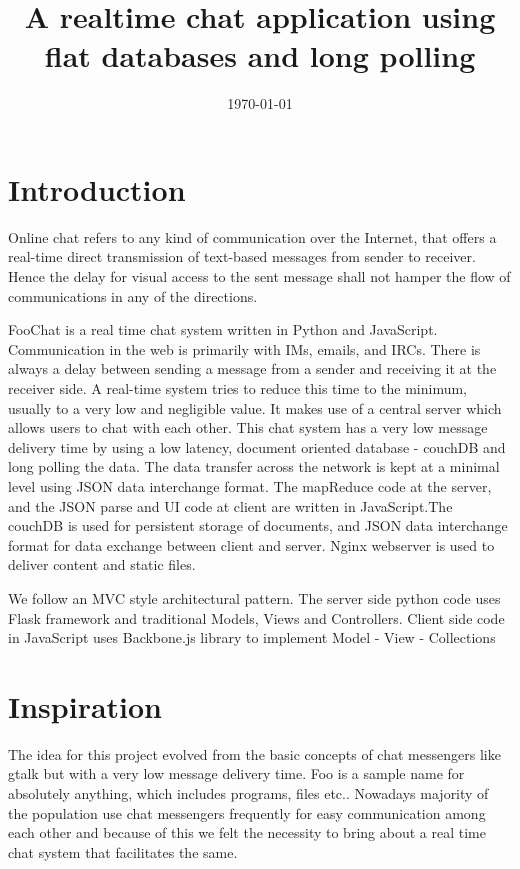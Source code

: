\documentclass[a4paper,11pt,conference]{IEEEtran}
\title{A realtime chat application using flat databases and long polling}
\date{\today}
\author{
	\IEEEauthorblockN{Jaseem Abid}
	\IEEEauthorblockA{B090264CS \\ jaseemabid@gmail.com}
\and 
	\IEEEauthorblockN{Irene George}
	\IEEEauthorblockA{B090234CS \\ plasid\_91@yahoo.co.in}
\and 
	\IEEEauthorblockN{Jincy Abraham}
	\IEEEauthorblockA{B090238CS \\ jincy.a@gmail.com }
\and
	\IEEEauthorblockN{Gayathri PP}
	\IEEEauthorblockA{B090412CS \\ pp.gayathri4u2@gmail.com }
}
\begin{document}
	\maketitle
	\vspace{100px}

	\section{Introduction}

	Online chat refers to any kind of communication over the Internet, that offers a real-time direct transmission of text-based messages from sender to receiver. Hence the delay for visual access to the sent message shall not hamper the flow of communications in any of the directions.

	FooChat is a real time chat system written in Python and JavaScript. Communication in the web is primarily with IMs, emails, and IRCs. There is always a delay between sending a message from a sender and receiving it at the receiver side. A real-time system tries to reduce this time to the minimum, usually to a very low and negligible value. It makes use of a central server which allows users to chat with each other. This chat system has a very low message delivery time by using a low latency, document oriented database - couchDB and long polling the data. The data transfer across the network is kept at a minimal level using JSON data interchange format. The mapReduce code at the server, and the JSON parse and UI code at client are written in JavaScript.The couchDB is used for persistent storage of documents, and JSON data interchange format for data exchange between client and server. Nginx webserver is used to deliver content and static files.

	We follow an MVC style architectural pattern. The server side python code uses Flask framework and traditional Models, Views and Controllers. Client side code in JavaScript uses Backbone.js library to implement Model - View - Collections


	\section{Inspiration}
	The idea for this project evolved from the basic concepts of chat messengers like gtalk but with a very low message delivery time. Foo is a sample name for absolutely anything, which includes programs, files etc..  Nowadays majority of the population use chat messengers frequently for easy communication among each other and because of this we felt the necessity to bring about a real time chat system that 
facilitates the same.
\end{document}
